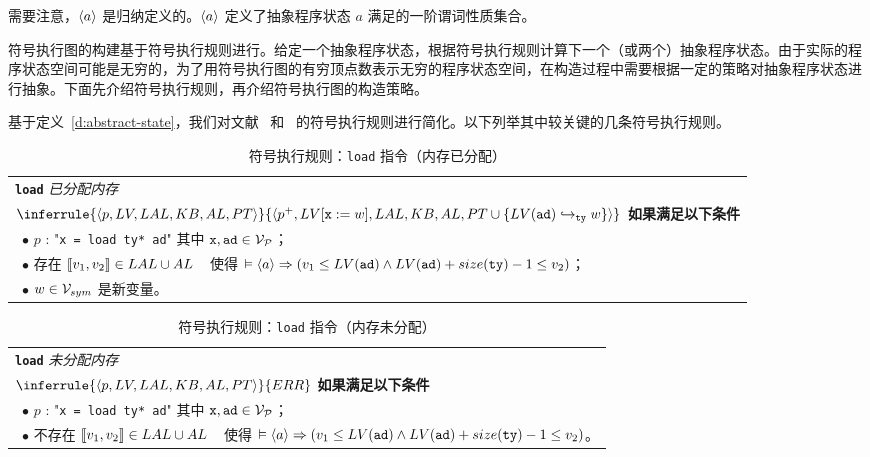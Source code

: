 需要注意，$\langle a\rangle$ 是归纳定义的。$\langle a \rangle$ 定义了抽象程序状态 $a$ 满足的一阶谓词性质集合。

符号执行图的构建基于符号执行规则进行。给定一个抽象程序状态，根据符号执行规则计算下一个（或两个）抽象程序状态。由于实际的程序状态空间可能是无穷的，为了用符号执行图的有穷顶点数表示无穷的程序状态空间，在构造过程中需要根据一定的策略对抽象程序状态进行抽象。下面先介绍符号执行规则，再介绍符号执行图的构造策略。

基于定义~\ref{d:abstract-state}，我们对文献~ 和~ 的符号执行规则进行简化。以下列举其中较关键的几条符号执行规则。


\begin{table}[htbp]
\caption{符号执行规则：\texttt{load} 指令（内存已分配）}
\label{tab:rule-load-alloc}
\begin{tabularx}{\textwidth}{|X|}
\hline
\textbf{\texttt{load}} \emph{已分配内存} \\
{\centering $
\inferrule
   {\lb p, LV, LAL, KB, AL, PT\rb}
   {\lb p^+, LV[\texttt{x}:= w], LAL, KB, AL, PT\cup\{LV(\texttt{ad})\pta_{\ty} w \}\rb }
$ \\}
\textbf{如果满足以下条件} \\
~$\bullet$ $p$ : "\texttt{x = load ty* ad}" 其中 $\texttt{x},\texttt{ad}\in\mathcal{V}_{\mathcal{P}}$； \\
~$\bullet$ 存在 $\llbracket v_1,v_2 \rrbracket\in LAL\cup AL$ \newline 
~\phantom{$\bullet$ } 使得 $\vDash \langle a\rangle \Rightarrow (v_1\le LV(\texttt{ad}) \land LV(\texttt{ad}) + size(\texttt{ty})-1\le v_2)$；  \\
~$\bullet$ $w\in\mathcal{V}_{sym}$ 是新变量。 \\
\hline
\end{tabularx}
\end{table}

\begin{table}[htbp]
\caption{符号执行规则：\texttt{load} 指令（内存未分配）}
\label{tab:rule-load-unalloc}
\begin{tabularx}{\textwidth}{|X|}
\hline
\textbf{\texttt{load}} \emph{未分配内存} \\
{\centering $
\inferrule
   {\lb p, LV, LAL, KB, AL, PT\rb}
   {ERR}
$ \\}
\textbf{如果满足以下条件} \\
~$\bullet$ $p$ : "\texttt{x = load ty* ad}" 其中 $\texttt{x},\texttt{ad}\in\mathcal{V}_{\mathcal{P}}$； \\
~$\bullet$ 不存在 $\llbracket v_1,v_2 \rrbracket\in LAL\cup AL$ \newline 
~\phantom{$\bullet$ } 使得 $\vDash \langle a\rangle \Rightarrow (v_1\le LV(\texttt{ad}) \land LV(\texttt{ad}) + size(\texttt{ty})-1\le v_2)$。  \\
\hline
\end{tabularx}
\end{table}

